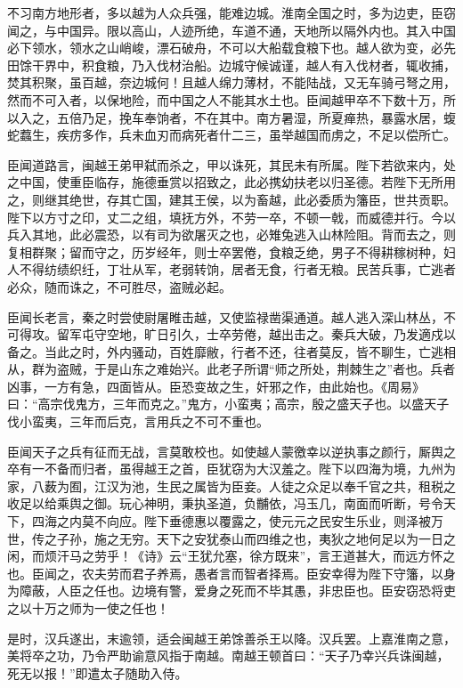 \documentclass[12pt,UTF8]{ctexbook}
\begin{document}
不习南方地形者，多以越为人众兵强，能难边城。淮南全国之时，多为边吏，臣窃闻之，与中国异。限以高山，人迹所绝，车道不通，天地所以隔外内也。其入中国必下领水，领水之山峭峻，漂石破舟，不可以大船载食粮下也。越人欲为变，必先田馀干界中，积食粮，乃入伐材治船。边城守候诚谨，越人有入伐材者，辄收捕，焚其积聚，虽百越，奈边城何！且越人绵力薄材，不能陆战，又无车骑弓弩之用，然而不可入者，以保地险，而中国之人不能其水土也。臣闻越甲卒不下数十万，所以入之，五倍乃足，挽车奉饷者，不在其中。南方暑湿，所夏瘅热，暴露水居，蝮蛇蠚生，疾疠多作，兵未血刃而病死者什二三，虽举越国而虏之，不足以偿所亡。



臣闻道路言，闽越王弟甲弑而杀之，甲以诛死，其民未有所属。陛下若欲来内，处之中国，使重臣临存，施德垂赏以招致之，此必携幼扶老以归圣德。若陛下无所用之，则继其绝世，存其亡国，建其王侯，以为畜越，此必委质为籓臣，世共贡职。陛下以方寸之印，丈二之组，填抚方外，不劳一卒，不顿一戟，而威德并行。今以兵入其地，此必震恐，以有司为欲屠灭之也，必雉兔逃入山林险阻。背而去之，则复相群聚；留而守之，历岁经年，则士卒罢倦，食粮乏绝，男子不得耕稼树种，妇人不得纺绩织纴，丁壮从军，老弱转饷，居者无食，行者无粮。民苦兵事，亡逃者必众，随而诛之，不可胜尽，盗贼必起。



臣闻长老言，秦之时尝使尉屠睢击越，又使监禄凿渠通道。越人逃入深山林丛，不可得攻。留军屯守空地，旷日引久，士卒劳倦，越出击之。秦兵大破，乃发適戍以备之。当此之时，外内骚动，百姓靡敝，行者不还，往者莫反，皆不聊生，亡逃相从，群为盗贼，于是山东之难始兴。此老子所谓“师之所处，荆棘生之”者也。兵者凶事，一方有急，四面皆从。臣恐变故之生，奸邪之作，由此始也。《周易》曰：“高宗伐鬼方，三年而克之。”鬼方，小蛮夷；高宗，殷之盛天子也。以盛天子伐小蛮夷，三年而后克，言用兵之不可不重也。



臣闻天子之兵有征而无战，言莫敢校也。如使越人蒙徼幸以逆执事之颜行，厮舆之卒有一不备而归者，虽得越王之首，臣犹窃为大汉羞之。陛下以四海为境，九州为家，八薮为囿，江汉为池，生民之属皆为臣妾。人徒之众足以奉千官之共，租税之收足以给乘舆之御。玩心神明，秉执圣道，负黼依，冯玉几，南面而听断，号令天下，四海之内莫不向应。陛下垂德惠以覆露之，使元元之民安生乐业，则泽被万世，传之子孙，施之无穷。天下之安犹泰山而四维之也，夷狄之地何足以为一日之闲，而烦汗马之劳乎！《诗》云“王犹允塞，徐方既来”，言王道甚大，而远方怀之也。臣闻之，农夫劳而君子养焉，愚者言而智者择焉。臣安幸得为陛下守籓，以身为障蔽，人臣之任也。边境有警，爱身之死而不毕其愚，非忠臣也。臣安窃恐将吏之以十万之师为一使之任也！



是时，汉兵遂出，末逾领，适会闽越王弟馀善杀王以降。汉兵罢。上嘉淮南之意，美将卒之功，乃令严助谕意风指于南越。南越王顿首曰：“天子乃幸兴兵诛闽越，死无以报！”即遣太子随助入侍。
\end{document}

